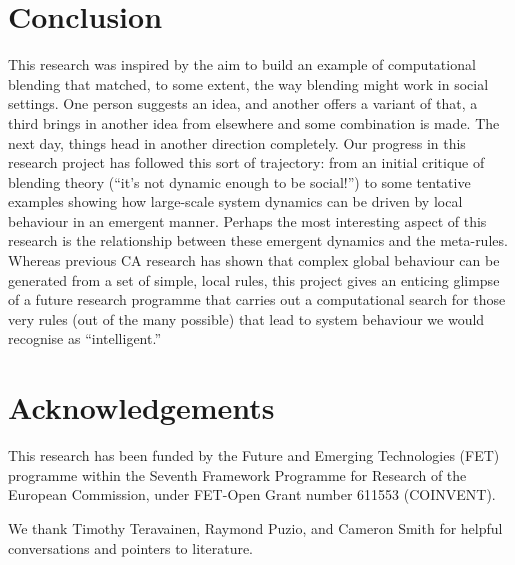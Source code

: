 \documentclass{AISB2008}
\begin{document}
\section{Conclusion}

This research was inspired by the aim to build an example of
computational blending that matched, to some extent, the way blending
might work in social settings.  One person suggests an idea, and
another offers a variant of that, a third brings in another idea from
elsewhere and some combination is made.  The next day, things head in
another direction completely.  Our progress in this research project
has followed this sort of trajectory: from an initial critique of
blending theory (``it's not dynamic enough to be social!'') to some
tentative examples showing how large-scale system dynamics can be
driven by local behaviour in an emergent manner.  Perhaps the most
interesting aspect of this research is the relationship between these
emergent dynamics and the meta-rules.  Whereas previous CA research
has shown that complex global behaviour can be generated from a set of
simple, local rules, this project gives an enticing glimpse of a
future research programme that carries out a computational search for
those very rules (out of the many possible) that lead to system
behaviour we would recognise as ``intelligent.''

\section{Acknowledgements}

This research has been funded by the Future and Emerging Technologies
(FET) programme within the Seventh Framework Programme for Research of
the European Commission, under FET-Open Grant number 611553
(COINVENT).

We thank Timothy Teravainen, Raymond Puzio, and Cameron Smith for
helpful conversations and pointers to literature.


\end{document}
